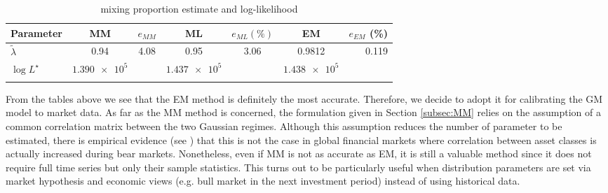 \begin{table}
	\centering
	\begin{tabular}{@{}lcccccr@{}} \toprule
		Parameter & MM & $e_{MM}$ & ML & $e_{ML} (\%)$ & EM & $e_{EM}$ (\%)\\ \midrule
		$\widetilde{\lambda}$  & 0.94  & 4.08 & 0.95 & 3.06 & 0.9812 & 0.119 \\
		\addlinespace[0.5em]
		$\log L^{\star}$ & $\num{1.390e+5}$ & & $\num{1.437e+5}$ & & $\num{1.438e+5}$ & \\ \bottomrule
		\addlinespace[0.5em]
	\end{tabular}
	\caption{mixing proportion estimate and log-likelihood}
	\label{tab:calibration3}
\end{table}
From the tables above we see that the EM method is definitely the most accurate. Therefore, we decide to adopt it for calibrating the GM model to market data. As far as the MM method is concerned, the formulation given in Section \ref{subsec:MM} relies on the assumption of a common correlation matrix between the two Gaussian regimes. Although this assumption reduces the number of parameter to be estimated, there is empirical evidence (see \cite{Campbell2002}) that this is not the case in global financial markets where correlation between asset classes is actually increased during bear markets. Nonetheless, even if MM is not as accurate as EM, it is still a valuable method since it does not require full time series but only their sample statistics. This turns out to be particularly useful when distribution parameters are set via market hypothesis and economic views (e.g. bull market in the next investment period) instead of using historical data.
